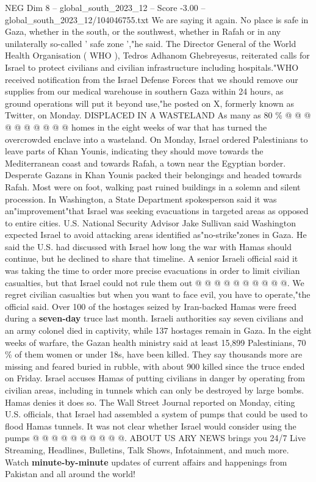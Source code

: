 \begin{textsample}{NEG Dim 8 – global\_south\_2023\_12 – Score -3.00 – global\_south\_2023\_12/104046755.txt}
We are saying it again.
No place is safe in Gaza, whether in the south, or the southwest, whether in Rafah or in any unilaterally so-called ' safe zone ',"he said.
The Director General of the World Health Organisation ( WHO ), Tedros Adhanom Ghebreyesus, reiterated calls for Israel to protect civilians and civilian infrastructure including hospitals."WHO received notification from the Israel Defense Forces that we should remove our supplies from our medical warehouse in southern Gaza within 24 hours, as ground operations will put it beyond use,"he posted on X, formerly known as Twitter, on Monday.
DISPLACED IN A WASTELAND As many as 80 \% @ @ @ @ @ @ @ @ @ @ homes in the eight weeks of war that has turned the overcrowded enclave into a wasteland.
On Monday, Israel ordered Palestinians to leave parts of Khan Younis, indicating they should move towards the Mediterranean coast and towards Rafah, a town near the Egyptian border.
Desperate Gazans in Khan Younis packed their belongings and headed towards Rafah.
Most were on foot, walking past ruined buildings in a solemn and silent procession.
In Washington, a State Department spokesperson said it was an"improvement"that Israel was seeking evacuations in targeted areas as opposed to entire cities.
U.S.
National Security Advisor Jake Sullivan said Washington expected Israel to avoid attacking areas identified as"no-strike"zones in Gaza.
He said the U.S. had discussed with Israel how long the war with Hamas should continue, but he declined to share that timeline.
A senior Israeli official said it was taking the time to order more precise evacuations in order to limit civilian casualties, but that Israel could not rule them out @ @ @ @ @ @ @ @ @ @.
We regret civilian casualties but when you want to face evil, you have to operate,"the official said.
Over 100 of the hostages seized by Iran-backed Hamas were freed during a \textbf{seven-day} truce last month.
Israeli authorities say seven civilians and an army colonel died in captivity, while 137 hostages remain in Gaza.
In the eight weeks of warfare, the Gazan health ministry said at least 15,899 Palestinians, 70 \% of them women or under 18s, have been killed.
They say thousands more are missing and feared buried in rubble, with about 900 killed since the truce ended on Friday.
Israel accuses Hamas of putting civilians in danger by operating from civilian areas, including in tunnels which can only be destroyed by large bombs.
Hamas denies it does so.
The Wall Street Journal reported on Monday, citing U.S. officials, that Israel had assembled a system of pumps that could be used to flood Hamas tunnels.
It was not clear whether Israel would consider using the pumps @ @ @ @ @ @ @ @ @ @.
ABOUT US ARY NEWS brings you 24/7 Live Streaming, Headlines, Bulletins, Talk Shows, Infotainment, and much more.
Watch \textbf{minute-by-minute} updates of current affairs and happenings from Pakistan and all around the world!

\end{textsample}
